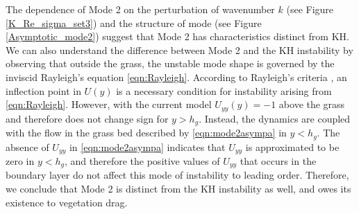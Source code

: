 \documentclass[12pt]{report}   %
\newcommand{\hg}{h_g}
\begin{document}
The dependence of Mode 2 on the perturbation of wavenumber $k$ (see Figure \ref{K_Re_sigma_set3}) and the structure of mode (see Figure \ref{Asymptotic_mode2}) suggest that Mode 2 has characteristics distinct from KH. We can also understand the difference between Mode 2 and the KH instability by observing that outside the grass, the unstable mode shape is governed by the inviscid Rayleigh's equation \eqref{eqn:Rayleigh}.
According to Rayleigh's criteria \cite{Rayleigh1879}, an inflection point in $U(y)$ is a necessary condition for instability arising from \eqref{eqn:Rayleigh}. However, with the current model $U_{yy}(y) = -1$ above the grass and therefore does not change sign for $y>\hg$. 
Instead, the dynamics are coupled with the flow in the grass bed described by \eqref{eqn:mode2asympa} in $y< \hg$.
The absence of $U_{yy}$ in \eqref{eqn:mode2asympa} indicates that $U_{yy}$ is approximated to be zero in $y<\hg$, and therefore the positive values of $U_{yy}$ that occurs in the boundary layer do not affect this mode of instability to leading order.
Therefore, we conclude that Mode 2 is distinct from the KH instability as well, and owes its existence to vegetation drag.
\end{document}

